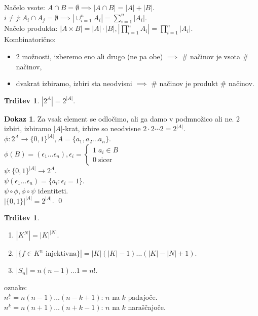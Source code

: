 \documentclass[a4paper, 12pt]{book}
\theoremstyle{definition}
\newtheorem{claim}[counter]{Trditev}
\newtheorem{pro}[counter]{Dokaz}
\theoremstyle{remark}
\begin{document}
Načelo vsote: $A \cap B = \emptyset \implies |A \cap B| = |A| + |B|$. \\
$i \neq j: A_i \cap A_j = \emptyset \implies |\cup_{i=1}^{n} A_i| = \sum_{i=1}^n |A_i|$. \\
Načelo produkta: $|A \times B| = |A| \cdot |B|, |\prod_{i=1}^n A_i| = \prod_{i=1}^{n} |A_i|$. \\
Kombinatorično:
\begin{itemize}[label={}]
  \item 2 možnosti, izberemo eno ali drugo (ne pa obe) $\implies$ \# načinov je vsota \# načinov,
  \item dvakrat izbiramo, izbiri sta neodvisni $\implies$ \# načinov je produkt \# načinov.
\end{itemize}
\begin{claim}
  $|2^A| = 2^{|A|}$.
\end{claim}
\begin{pro}
  Za vsak element se odločimo, ali ga damo v podmnožico ali ne.
  2 izbiri, izbiramo $|A|$-krat, izbire so neodvisne $2 \cdot 2 \cdots 2 = 2^{|A|}$. \\
  $\phi: 2^A \to \{0,1\}^{|A|}, A = \{a_1, a_2 \dots a_n\}$. \\
  $\phi(B) = (\epsilon_1 \dots \epsilon_n), \epsilon_i = \begin{cases}
      1 \; a_i \in B \\
      0 \; \text{sicer}
    \end{cases}$ \\
  $\psi: \{0,1\}^{|A|} \to 2^A$. \\
  $\psi(\epsilon_1 \dots \epsilon_n) = \{a_i: \epsilon_i = 1\}$. \\
  $\psi \circ \phi, \phi \circ \psi$ identiteti. \\
  $|\{0,1\}|^{|A|} = 2^{|A|}$.
  \qed
\end{pro}
\begin{claim} \text{}
  \begin{enumerate}
    \item $|K^N| = |K|^{|N|}$.
    \item $|\{f \in K^n \text{ injektivna}\}| = |K| (|K|-1) \dots (|K|-|N|+1)$.
    \item $|S_n| = n (n-1) \dots 1 = n!$.
  \end{enumerate}
\end{claim}
oznake: \\
$n^{\underline{k}} = n (n-1) \dots (n-k+1)$: $n$ na $k$ padajoče. \\
$n^{\overline{k}} = n (n+1) \dots (n+k-1)$: $n$ na $k$ naraščajoče.
\end{document}
